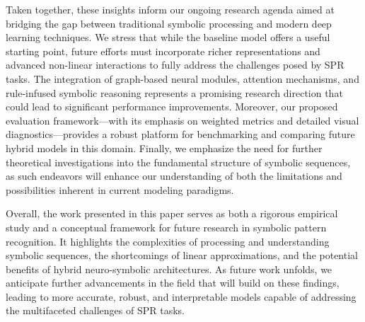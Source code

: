 \documentclass{article}
\begin{document}
Taken together, these insights inform our ongoing research agenda aimed at bridging the gap between traditional symbolic processing and modern deep learning techniques. We stress that while the baseline model offers a useful starting point, future efforts must incorporate richer representations and advanced non-linear interactions to fully address the challenges posed by SPR tasks. The integration of graph-based neural modules, attention mechanisms, and rule-infused symbolic reasoning represents a promising research direction that could lead to significant performance improvements. Moreover, our proposed evaluation framework—with its emphasis on weighted metrics and detailed visual diagnostics—provides a robust platform for benchmarking and comparing future hybrid models in this domain. Finally, we emphasize the need for further theoretical investigations into the fundamental structure of symbolic sequences, as such endeavors will enhance our understanding of both the limitations and possibilities inherent in current modeling paradigms.

Overall, the work presented in this paper serves as both a rigorous empirical study and a conceptual framework for future research in symbolic pattern recognition. It highlights the complexities of processing and understanding symbolic sequences, the shortcomings of linear approximations, and the potential benefits of hybrid neuro-symbolic architectures. As future work unfolds, we anticipate further advancements in the field that will build on these findings, leading to more accurate, robust, and interpretable models capable of addressing the multifaceted challenges of SPR tasks.
\end{document}
